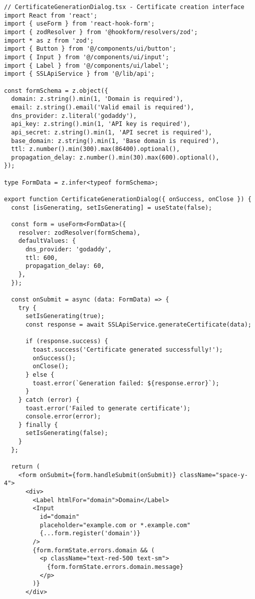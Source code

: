 \begin{verbatim}
// CertificateGenerationDialog.tsx - Certificate creation interface
import React from 'react';
import { useForm } from 'react-hook-form';
import { zodResolver } from '@hookform/resolvers/zod';
import * as z from 'zod';
import { Button } from '@/components/ui/button';
import { Input } from '@/components/ui/input';
import { Label } from '@/components/ui/label';
import { SSLApiService } from '@/lib/api';

const formSchema = z.object({
  domain: z.string().min(1, 'Domain is required'),
  email: z.string().email('Valid email is required'),
  dns_provider: z.literal('godaddy'),
  api_key: z.string().min(1, 'API key is required'),
  api_secret: z.string().min(1, 'API secret is required'),
  base_domain: z.string().min(1, 'Base domain is required'),
  ttl: z.number().min(300).max(86400).optional(),
  propagation_delay: z.number().min(30).max(600).optional(),
});

type FormData = z.infer<typeof formSchema>;

export function CertificateGenerationDialog({ onSuccess, onClose }) {
  const [isGenerating, setIsGenerating] = useState(false);
  
  const form = useForm<FormData>({
    resolver: zodResolver(formSchema),
    defaultValues: {
      dns_provider: 'godaddy',
      ttl: 600,
      propagation_delay: 60,
    },
  });

  const onSubmit = async (data: FormData) => {
    try {
      setIsGenerating(true);
      const response = await SSLApiService.generateCertificate(data);
      
      if (response.success) {
        toast.success('Certificate generated successfully!');
        onSuccess();
        onClose();
      } else {
        toast.error(`Generation failed: ${response.error}`);
      }
    } catch (error) {
      toast.error('Failed to generate certificate');
      console.error(error);
    } finally {
      setIsGenerating(false);
    }
  };

  return (
    <form onSubmit={form.handleSubmit(onSubmit)} className="space-y-4">
      <div>
        <Label htmlFor="domain">Domain</Label>
        <Input
          id="domain"
          placeholder="example.com or *.example.com"
          {...form.register('domain')}
        />
        {form.formState.errors.domain && (
          <p className="text-red-500 text-sm">
            {form.formState.errors.domain.message}
          </p>
        )}
      </div>


\end{verbatim}
